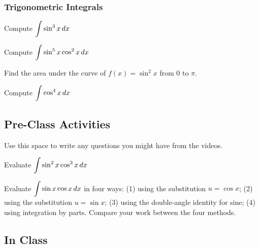 \documentclass[notes]{subfiles}
\begin{document}
	\subsubsection*{Trigonometric Integrals}
		\begin{ex}
			Compute $\displaystyle \int \sin^3 x\, dx$
		\end{ex}
			\newpage
			
		\begin{ex}
			Compute $\displaystyle \int \sin^5x\cos^2x\, dx$
		\end{ex}
			
		\begin{ex}
			Find the area under the curve of $f(x) = \sin^2x$ from $0$ to $\pi$.
		\end{ex}
			
		\begin{ex}
			Compute $\displaystyle \int \cos^4x\, dx$
		\end{ex}
			\newpage
		
	\subsection*{Pre-Class Activities}
		\begin{ex}
			Use this space to write any questions you might have from the videos.
		\end{ex}
			
		\begin{ex}
			Evaluate $\displaystyle \int \sin^2 x\cos^3x\, dx$
		\end{ex}
			
		\begin{ex}
			Evaluate $\displaystyle \int \sin x\cos x\, dx$ in four ways: (1) using the substitution $u = \cos x$; (2) using the substitution $u = \sin x$; (3) using the double-angle identity for sine; (4) using integration by parts.  Compare your work between the four methods.
		\end{ex}	
			\newpage
			
	\subsection*{In Class}
\end{document}
